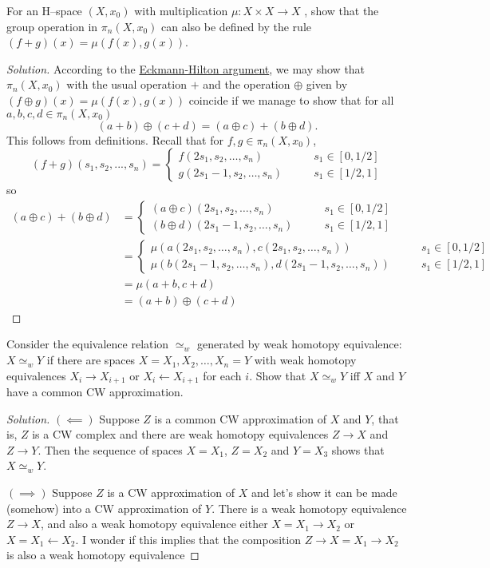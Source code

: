 \begin{exercise}[4.1.3]
	For an H–space $(X , x_0 )$ with multiplication $\mu : X \times X \to X$ , show that the group operation in $\pi_n(X,x_0)$ can also be defined by the rule $(f + g)(x) = \mu(f(x),g(x))$.
\end{exercise}
\begin{proof}[Solution]
	According to the \href{https://en.wikipedia.org/wiki/Eckmann–Hilton_argument}{Eckmann-Hilton argument}, we may show that $\pi_n(X,x_0)$ with the usual operation $+$ and the operation $\oplus$  given by $(f\oplus g)(x) = \mu(f(x),g(x))$ coincide if we manage to show that for all $a,b,c,d\in \pi_n(X,x_0)$
	\[
		(a+b)\oplus(c+d)=(a\oplus c)+(b\oplus d)
	.\]
This follows from definitions. Recall that for $f,g\in \pi_n(X,x_0)$,
\[
	(f+g)(s_1,s_2,...,s_n)=\begin{cases}
		f(2s_1,s_2,\ldots,s_n)\qquad &s_1\in [0,1/2]\\
		g(2s_1-1,s_2,\ldots,s_n)\qquad &s_1\in [1/2,1]
	\end{cases}
\]
so
\begin{align*}
	(a\oplus c)+(b\oplus d)&=\begin{cases}
		(a\oplus c)(2s_1,s_2,\ldots,s_n)\qquad &s_1\in [0,1/2]\\
		(b\oplus d)(2s_1-1,s_2,\ldots,s_n)\qquad &s_1\in [1/2,1]
	\end{cases}\\
		&=\begin{cases}
		\mu(a(2s_1,s_2,\ldots,s_n),c(2s_1,s_2,\ldots,s_n))\qquad &s_1\in [0,1/2]\\
		\mu(b(2s_1-1,s_2,\ldots,s_n),d(2s_1-1,s_2,\ldots,s_n))\qquad &s_1\in [1/2,1]
	\end{cases}\\
		&=\mu(a+b,c+d)\\
		&=(a+ b)\oplus(c+ d)
\end{align*}


\end{proof}

\begin{exercise}[4.1.19]
	Consider the equivalence relation $\simeq_w$ generated by weak homotopy equivalence: $X \simeq_w Y$ if there are spaces $X = X_1, X_2,\ldots, X_n = Y$ with weak homotopy equivalences $X_i\to X_{i+1}$ or $X_i\leftarrow X_{i+1}$ for each $i$. Show that $X\simeq_w Y$ iff $X$ and $Y$ have a common CW approximation.
\end{exercise}
\begin{proof}[Solution]
	$(\impliedby)$ Suppose $Z$ is a common CW approximation of $X$ and $Y$, that is, $Z$ is a CW complex and there are weak homotopy equivalences $Z\to X$ and $Z\to Y$. Then the sequence of spaces $X=X_1$, $Z=X_2$ and $Y=X_3$ shows that $X\simeq_wY$.
	
	$(\implies)$ Suppose $Z$ is a CW approximation of $X$ and let's show it can be made (somehow) into a CW approximation of $Y$. There is a weak homotopy equivalence $Z\to X$, and also a weak homotopy equivalence either $X=X_1\to X_2$ or $X=X_1\leftarrow X_2$. I wonder if this implies that the composition $Z\to X=X_1\to X_2$ is also a weak homotopy equivalence
\end{proof}

